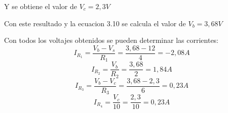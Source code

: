 \begin{example}
        Y se obtiene el valor de $V_c=2,3V$

        Con este resultado y la ecuacion 3.10 se calcula el valor de $V_b=3,68V$

        Con todos los voltajes obtenidos se pueden determinar las corrientes:
        \begin{equation*}
        I_{R_1}=\frac{V_b-V_s}{R_1}=\frac{3,68-12}{4}=-2,08 A
        \end{equation*}
        \begin{equation*}
        I_{R_2}=\frac{V_b}{R_2}=\frac{3,68}{2}= 1,84 A
        \end{equation*}
        \begin{equation*}
        I_{R_3}=\frac{V_b-V_c}{R_3}=\frac{3,68-2,3}{6}=0,23 A
        \end{equation*}
        \begin{equation*}
        I_{R_4}=\frac{V_c}{10}=\frac{2,3}{10}=0,23 A
        \end{equation*}

    \end{example}

